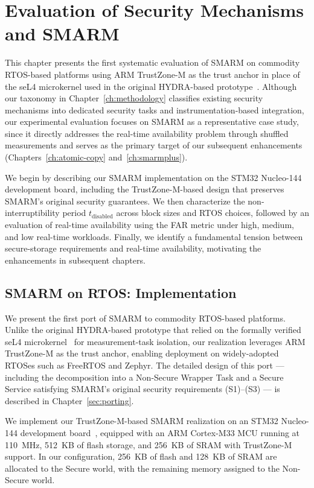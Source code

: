 \documentclass[a4paper,10pt]{article}
\begin{document}
{\section{Evaluation of Security Mechanisms and SMARM}
\label{ch:eval-smarm}

This chapter presents the first systematic evaluation of SMARM on 
commodity RTOS-based platforms using ARM TrustZone-M as the trust 
anchor in place of the seL4 microkernel used in the original 
HYDRA-based prototype~\cite{eldefrawy2017hydra,carpent2018smarm}. 
Although our taxonomy in Chapter~\ref{ch:methodology} classifies 
existing security mechanisms into dedicated security tasks and 
instrumentation-based integration, our experimental evaluation 
focuses on SMARM as a representative case study, since it directly 
addresses the real-time availability problem through shuffled 
measurements and serves as the primary target of our subsequent 
enhancements (Chapters~\ref{ch:atomic-copy} and~\ref{ch:smarmplus}).

We begin by describing our SMARM implementation on the STM32 Nucleo-144 
development board, including the TrustZone-M-based design that 
preserves SMARM's original security guarantees. We then characterize 
the non-interruptibility period $t_{\mathrm{disabled}}$ across block 
sizes and RTOS choices, followed by an evaluation of real-time 
availability using the FAR metric under high, medium, and low real-time 
workloads. Finally, we identify a fundamental tension between 
secure-storage requirements and real-time availability, motivating 
the enhancements in subsequent chapters.

\subsection{SMARM on RTOS: Implementation}
\label{sec:smarm-impl}

We present the first port of SMARM to commodity RTOS-based platforms. 
Unlike the original HYDRA-based prototype that relied on the formally 
verified seL4 microkernel~\cite{klein2009sel4} for measurement-task 
isolation, our realization leverages ARM TrustZone-M as the trust 
anchor, enabling deployment on widely-adopted RTOSes such as FreeRTOS 
and Zephyr. The detailed design of this port — including the 
decomposition into a Non-Secure Wrapper Task and a Secure Service 
satisfying SMARM's original security requirements (S1)--(S3) — is 
described in Chapter~\ref{sec:porting}.

We implement our TrustZone-M-based SMARM realization on an STM32 
Nucleo-144 development board~\cite{stm32nucleo144}, equipped with an ARM 
Cortex-M33 MCU running at 110~MHz, 512~KB of flash storage, and 256~KB of 
SRAM with TrustZone-M support. In our configuration, 256~KB of flash and 
128~KB of SRAM are allocated to the Secure world, with the remaining memory 
assigned to the Non-Secure world.

}
\end{document}
